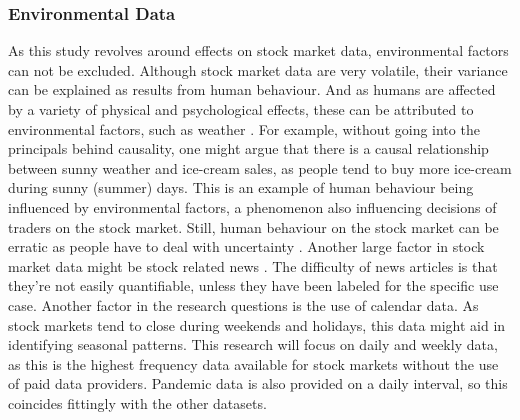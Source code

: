 \subsubsection{Environmental Data}
As this study revolves around effects on stock market data, environmental factors can not be excluded. Although stock market data are very volatile, their variance can be explained as results from human behaviour. And as humans are affected by a variety of physical and psychological effects, these can be attributed to environmental factors, such as weather \cite{hirshleifer2003good}. For example, without going into the principals behind causality, one might argue that there is a causal relationship between sunny weather and ice-cream sales, as people tend to buy more ice-cream during sunny (summer) days. This is an example of human behaviour being influenced by environmental factors, a phenomenon also influencing decisions of traders on the stock market. Still, human behaviour on the stock market can be erratic as people have to deal with uncertainty \cite{tversky1974judgment}. %
Another large factor in stock market data might be stock related news \cite{tversky1974judgment, veronesi1999stock, onsumran2015gold, wang2019internet}. The difficulty of news articles is that they're not easily quantifiable, unless they have been labeled for the specific use case. %
Another factor in the research questions is the use of calendar data. As stock markets tend to close during weekends and holidays, this data might aid in identifying seasonal patterns. This research will focus on daily and weekly data, as this is the highest frequency data available for stock markets without the use of paid data providers. Pandemic data is also provided on a daily interval, so this coincides fittingly with the other datasets.

